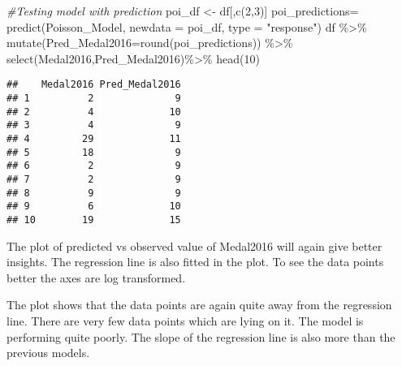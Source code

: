 \documentclass[
]{article}
\newenvironment{Shaded}{\begin{snugshade}}{\end{snugshade}}
\newcommand{\AttributeTok}[1]{\textcolor[rgb]{0.77,0.63,0.00}{#1}}
\newcommand{\CommentTok}[1]{\textcolor[rgb]{0.56,0.35,0.01}{\textit{#1}}}
\newcommand{\DecValTok}[1]{\textcolor[rgb]{0.00,0.00,0.81}{#1}}
\newcommand{\FunctionTok}[1]{\textcolor[rgb]{0.00,0.00,0.00}{#1}}
\newcommand{\NormalTok}[1]{#1}
\newcommand{\OtherTok}[1]{\textcolor[rgb]{0.56,0.35,0.01}{#1}}
\newcommand{\SpecialCharTok}[1]{\textcolor[rgb]{0.00,0.00,0.00}{#1}}
\newcommand{\StringTok}[1]{\textcolor[rgb]{0.31,0.60,0.02}{#1}}
\begin{document}
\begin{Shaded}
\begin{Highlighting}[]
\CommentTok{\#Testing model with prediction}
\NormalTok{poi\_df }\OtherTok{\textless{}{-}}\NormalTok{ df[,}\FunctionTok{c}\NormalTok{(}\DecValTok{2}\NormalTok{,}\DecValTok{3}\NormalTok{)]}
\NormalTok{poi\_predictions}\OtherTok{=} \FunctionTok{predict}\NormalTok{(Poisson\_Model, }\AttributeTok{newdata =}\NormalTok{ poi\_df, }\AttributeTok{type =} \StringTok{"response"}\NormalTok{)}
\NormalTok{df }\SpecialCharTok{\%\textgreater{}\%}
  \FunctionTok{mutate}\NormalTok{(}\AttributeTok{Pred\_Medal2016=}\FunctionTok{round}\NormalTok{(poi\_predictions)) }\SpecialCharTok{\%\textgreater{}\%}
  \FunctionTok{select}\NormalTok{(Medal2016,Pred\_Medal2016)}\SpecialCharTok{\%\textgreater{}\%}
  \FunctionTok{head}\NormalTok{(}\DecValTok{10}\NormalTok{)}
\end{Highlighting}
\end{Shaded}

\begin{verbatim}
##    Medal2016 Pred_Medal2016
## 1          2              9
## 2          4             10
## 3          4              9
## 4         29             11
## 5         18              9
## 6          2              9
## 7          2              9
## 8          9              9
## 9          6             10
## 10        19             15
\end{verbatim}

The plot of predicted vs observed value of Medal2016 will again give
better insights. The regression line is also fitted in the plot. To see
the data points better the axes are log transformed.

The plot shows that the data points are again quite away from the
regression line. There are very few data points which are lying on it.
The model is performing quite poorly. The slope of the regression line
is also more than the previous models.
\end{document}
